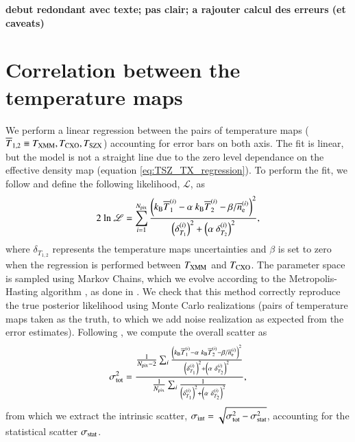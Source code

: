 \documentclass[twocolumn,traditabstract]{aa}
\newcommand{\ccor}[1]{\textcolor{Mypink}{#1}}
\def\TSZ {T_{\rm SZX}}
\def \TXC {T_{\rm CXO}}
\def \TXX {T_{\rm XMM}}
\begin{document}
{\bf debut redondant avec texte; pas clair; a rajouter calcul des erreurs (et caveats)} 

\section{Correlation between the temperature maps}\label{append:correlation}
\ccor{We perform a linear regression between the pairs of temperature maps ($\overline{T}_{1,2} \equiv \TXX, \TXC, \TSZ$) accounting for error bars on both axis. The fit is linear, but the model is not a straight line due to the zero level dependance on the effective density map (equation \ref{eq:TSZ_TX_regression}). To perform the fit, we follow \cite{Orear1982} and define the following likelihood, $\mathscr{L}$, as
\begin{equation}
2 \ {\rm ln} \ \mathscr{L} = \sum_{i=1}^{N_{\rm pix}} \frac{\left(k_{\rm B} \overline{T}^{(i)}_{1} - \alpha \ k_{\rm B} \overline{T}^{(i)}_{2} - {\beta}/{\overline{n}_{\rm e}^{(i)}}\right)^2}{\left(\delta^{(i)}_{T_{1}}\right)^2 + \left(\alpha \ \delta^{(i)}_{T_{2}}\right)^2},
\label{eq:chi2_def}
\end{equation}
where $\delta_{T_{1,2}}$ represents the temperature maps uncertainties and $\beta$ is set to zero when the regression is performed between $\TXX$ and $\TXC$. The parameter space is sampled using Markov Chains, which we evolve according to the Metropolis-Hasting algorithm \citep{Chib1995}, as done in \cite{Adam2015}. We check that this method correctly reproduce the true posterior likelihood using Monte Carlo realizations (pairs of temperature maps taken as the truth, to which we add noise realization as expected from the error estimates). Following \citep{Pratt2009}, we compute the overall scatter as
\begin{equation}
\sigma_{\rm tot}^2 = \frac{\frac{1}{N_{\rm pix} - 2} \sum_i \frac{\left(k_{\rm B} \overline{T}^{(i)}_{1} - \alpha \ k_{\rm B} \overline{T}^{(i)}_{2} - {\beta}/{\overline{n}_{\rm e}^{(i)}}\right)^2}{\left(\delta^{(i)}_{T_{1}}\right)^2 + \left(\alpha \ \delta^{(i)}_{T_{2}}\right)^2}}{\frac{1}{N_{\rm pix}} \sum_i \frac{1}{\left(\delta^{(i)}_{T_{1}}\right)^2 + \left(\alpha \ \delta^{(i)}_{T_{2}}\right)^2}},
\label{eq:scatter_def}
\end{equation}
from which we extract the intrinsic scatter, $\sigma_{\rm int} = \sqrt{\sigma_{\rm tot}^2 - \sigma_{\rm stat}^2}$, accounting for the statistical scatter $\sigma_{\rm stat}$.}
\end{document}
